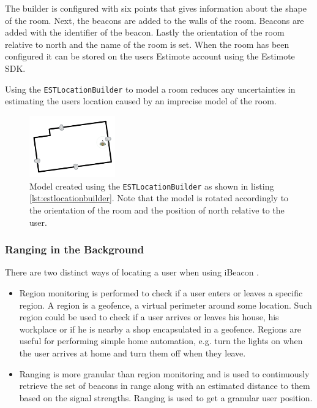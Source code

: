 The builder is configured with six points that gives information about the shape of the room. Next, the beacons are added to the walls of the room. Beacons are added with the identifier of the beacon. Lastly the orientation of the room relative to north and the name of the room is set. When the room has been configured it can be stored on the users Estimote account using the Estimote SDK.

Using the \texttt{ESTLocationBuilder} to model a room reduces any uncertainties in estimating the users location caused by an imprecise model of the room.

\begin{figure}
\centering
\includegraphics[width=0.33\textwidth]{images/living-room}
\caption{Model created using the \texttt{ESTLocationBuilder} as shown in listing \ref{lst:estlocationbuilder}. Note that the model is rotated accordingly to the orientation of the room and the position of north relative to the user.}
\label{fig:estlocationbuilder-livingroom}
\end{figure}

\subsubsection{Ranging in the Background}

There are two distinct ways of locating a user when using iBeacon \cite{estimote:monitoring-ranging}.

\begin{itemize}
\item Region monitoring is performed to check if a user enters or leaves a specific region. A region is a geofence, a virtual perimeter around some location. Such region could be used to check if a user arrives or leaves his house, his workplace or if he is nearby a shop encapsulated in a geofence. Regions are useful for performing simple home automation, e.g. turn the lights on when the user arrives at home and turn them off when they leave.
\item Ranging is more granular than region monitoring and is used to continuously retrieve the set of beacons in range along with an estimated distance to them based on the signal strengths. Ranging is used to get a granular user position.
\end{itemize}

